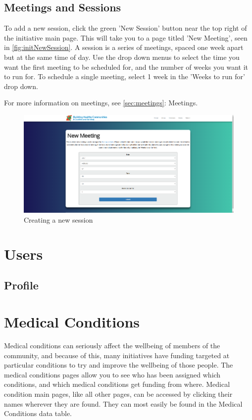 \documentclass{bhcguides}
\begin{document}
\subsection{Meetings and Sessions}
\label{ssec:initmeets}

To add a new session, click the green 'New Session' button near the top right of the initiative main page. This will take you to a page titled 'New Meeting', seen in \autoref{fig:initNewSession}. A session is a series of meetings, spaced one week apart but at the same time of day. Use the drop down menus to select the time you want the first meeting to be scheduled for, and the number of weeks you want it to run for. To schedule a single meeting, select 1 week in the 'Weeks to run for' drop down.

For more information on meetings, see \autoref{sec:meetings}: Meetings.

\begin{figure}[h!]
 \centerline{\includegraphics[width=\textwidth, height=\textheight, keepaspectratio]{initnewsession.png}}
 \caption{Creating a new session}
 \label{fig:initNewSession}
\end{figure}


\section{Users}
\label{sec:users}

\subsection{Profile}
\label{ssec:profile}

\section{Medical Conditions}
\label{sec:medical}

Medical conditions can seriously affect the wellbeing of members of the community, and because of this, many initiatives have funding targeted at particular conditions to try and improve the wellbeing of those people. The medical conditions pages allow you to see who has been assigned which conditions, and which medical conditions get funding from where. Medical condition main pages, like all other pages, can be accessed by clicking their names wherever they are found. They can most easily be found in the Medical Conditions data table.
\end{document}

